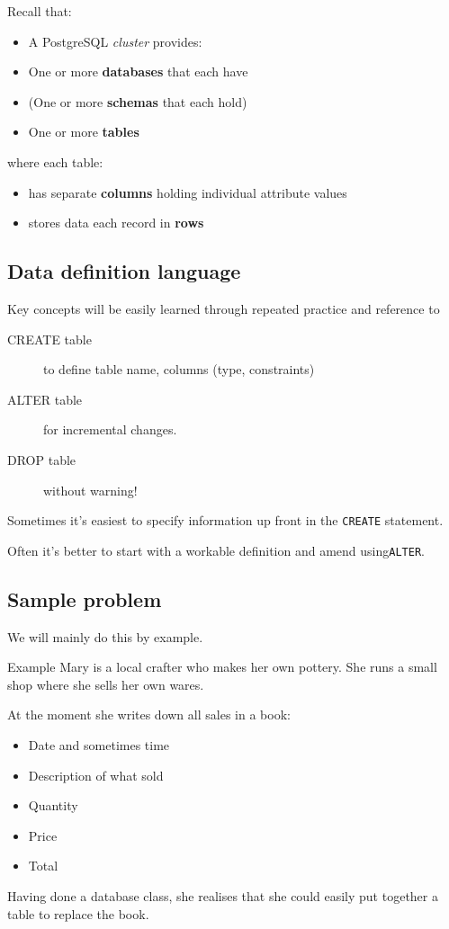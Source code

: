 \documentclass[slides]{pgnotes}
\begin{document}
Recall that:

\begin{itemize}
\item A PostgreSQL \textit{cluster} provides:
\item One or more \textbf{databases} that each have
\item (One or more \textbf{schemas} that each hold)
\item One or more \textbf{tables}
\end{itemize}

where each table:

\begin{itemize}
\item has separate \textbf{columns} holding individual attribute values
\item stores data each record in \textbf{rows}
\end{itemize}


\subsection{Data definition language}

Key concepts will be easily learned through repeated practice and
reference to

\begin{description}
\item[CREATE table]
  to define table name, columns (type, constraints)
\item[ALTER table]
  for incremental changes.
\item[DROP table]
  without warning!
\end{description}

Sometimes it's easiest to specify information up front in the \texttt{CREATE} statement.

Often it's better to start with a workable definition and amend using\texttt{ALTER}.

\subsection{Sample problem}

We will mainly do this by example.

\begin{greenbox}{Example}
  Mary is a local crafter who makes her own pottery.
  She runs a small shop where she sells her own wares.

  At the moment she writes down all sales in a book:
  \begin{itemize}
  \item Date and sometimes time
  \item Description of what sold
  \item Quantity
  \item Price
  \item Total
  \end{itemize}

  Having done a database class, she realises that she could easily put together a table to replace the book.
\end{greenbox}
\end{document}
